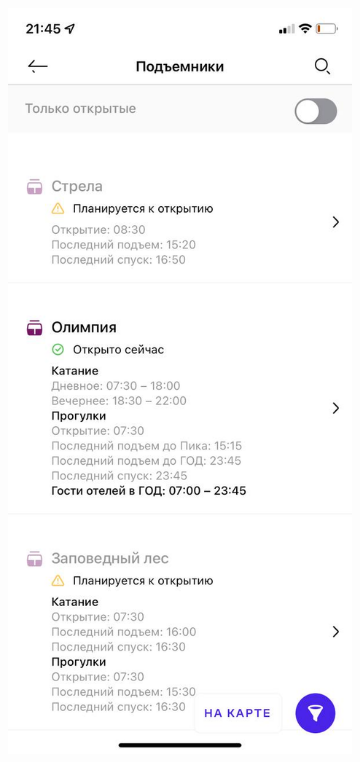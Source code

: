 \begin{figure}[h!]
\begin{center}
\begin{subfigure}{.33\textwidth}
			\label{img:rslope}
			\captionsetup{justification=centering}
			\caption{}
		\end{subfigure}%
		\begin{subfigure}{.33\textwidth}
			\centering
			\includegraphics[width=.95\linewidth]{../imgs/analogue_apps/rlift.png}

\end{subfigure}
\end{center}
\end{figure}

